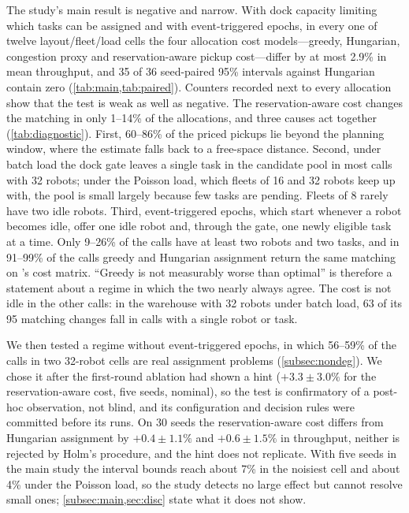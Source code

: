 The study's main result is negative and narrow. With dock capacity limiting
which tasks can be assigned and with event-triggered epochs, in every one of
twelve layout/fleet/load cells the four allocation cost models---greedy,
Hungarian, congestion proxy and reservation-aware pickup cost---differ by at most 2.9\% in
mean throughput, and 35 of 36 seed-paired 95\% intervals against Hungarian
contain zero (\cref{tab:main,tab:paired}). Counters recorded next to every
allocation show that the test is weak as well as negative. The
reservation-aware cost changes the matching in only 1--14\% of the
allocations, and three causes act together (\cref{tab:diagnostic}). First,
60--86\% of the priced pickups lie beyond the planning
window, where the estimate falls back to a free-space distance. Second, under
batch load the dock gate leaves a single task in the candidate pool in most calls
with 32 robots; under the Poisson load, which fleets of 16 and 32 robots keep up
with, the pool is small largely because few tasks are pending. Fleets of 8
rarely have two idle robots. Third, event-triggered
epochs, which start whenever a robot becomes idle, offer one idle robot and,
through the gate, one newly eligible task at a time.
Only 9--26\% of the calls have at least two robots and two tasks, and in 91--99\%
of the calls greedy and Hungarian assignment return the same matching on \sname's cost matrix.
``Greedy is not measurably worse than optimal'' is therefore a statement about
a regime in which the two nearly always agree. The cost is not idle in the other calls: in the warehouse with
32 robots under batch load, 63 of its 95 matching changes fall in calls with
a single robot or task.

We then tested a regime without event-triggered
epochs, in which 56--59\% of the calls in two 32-robot cells are real
assignment problems (\cref{subsec:nondeg}). We chose it after the first-round ablation had shown a hint
($+3.3\pm3.0\%$ for the reservation-aware cost, five seeds, nominal), so the
test is confirmatory of a post-hoc observation, not blind, and its configuration and
decision rules were committed before its runs. On 30 seeds the reservation-aware cost differs
from Hungarian assignment by $+0.4\pm1.1\%$ and $+0.6\pm1.5\%$ in throughput, neither is rejected by
Holm's procedure, and the hint does not replicate. With five seeds in the main study the interval
bounds reach about 7\% in the noisiest cell and about 4\% under the Poisson
load, so the study detects no large effect but cannot resolve small ones;
\cref{subsec:main,sec:disc} state what it does not show.

